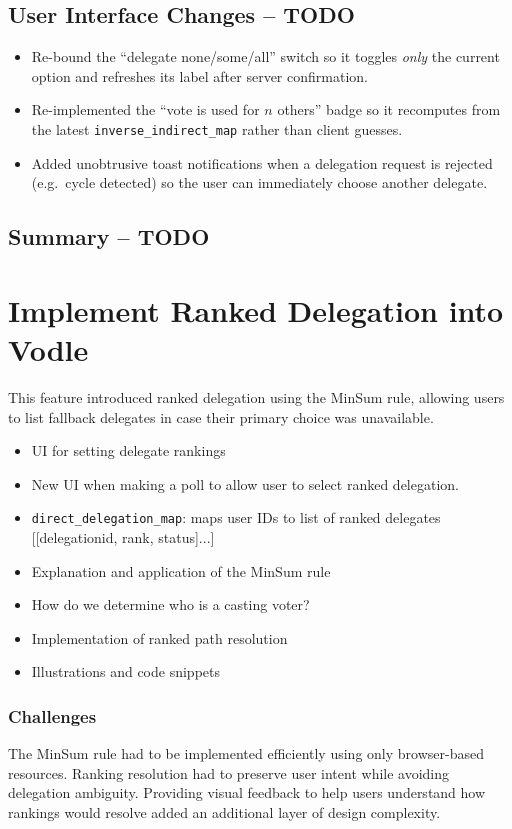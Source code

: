 \subsection{User Interface Changes -- TODO}
\begin{itemize}
  \item Re-bound the ``delegate none/some/all'' switch so it toggles \emph{only} the current option and refreshes its label after server confirmation.
  \item Re-implemented the ``vote is used for \(n\) others'' badge so it recomputes from the latest \texttt{inverse\_indirect\_map} rather than client guesses.
  \item Added unobtrusive toast notifications when a delegation request is rejected (e.g.\ cycle detected) so the user can immediately choose another delegate.
\end{itemize}

\subsection{Summary -- TODO}


\section{Implement Ranked Delegation into Vodle}\label{sec:design_ranked_delegation}
This feature introduced ranked delegation using the MinSum rule, allowing users to list fallback delegates in case their primary choice was unavailable.

\begin{itemize}
  \item UI for setting delegate rankings
  \item New UI when making a poll to allow user to select ranked delegation.
  \item \verb|direct_delegation_map|: maps user IDs to list of ranked delegates [[delegationid, rank, status]...]
  \item Explanation and application of the MinSum rule
  \item How do we determine who is a casting voter?
  \item Implementation of ranked path resolution
  \item Illustrations and code snippets
\end{itemize}

\subsubsection{Challenges}
The MinSum rule had to be implemented efficiently using only browser-based resources. Ranking resolution had to preserve user intent while avoiding delegation ambiguity. Providing visual feedback to help users understand how rankings would resolve added an additional layer of design complexity.


